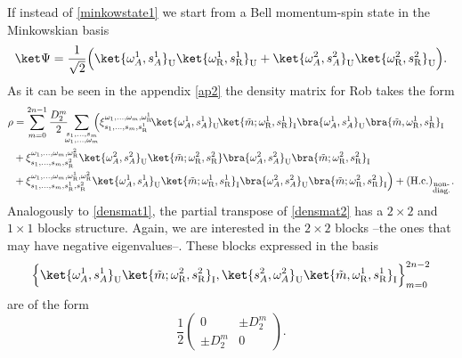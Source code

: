 If instead of \eqref{minkowstate1} we start from a Bell momentum-spin state in the Minkowskian basis
\begin{equation}\label{minkowstate2}\ket\Psi=\frac{1}{\sqrt2}\Big(\ket{\omega_A^1,s_A^1}_{\text{U}}\ket{\omega^1_\text{R},s^1_\text{R}}_\text{U}+\ket{\omega^2_A,s^2_A}_{\text{U}}\ket{\omega^2_\text{R},s^2_\text{R}}_\text{U}\Big).
\end{equation}
As it can be seen in the appendix \ref{ap2} the density matrix for Rob takes the form 
\begin{align}\label{densmat2}
\rho&=\nonumber\sum_{m=0}^{2n-1}\frac{D_{2}^m}{2}\!\!\!\sum_{\substack{s_1,\dots,s_m\\\omega_1,\dots,\omega_m}}\!\!\!\!
\Big(\xi_{s_1,\dots,s_m,s_\text{R}^1}^{\omega_1,\dots,\omega_m,\omega_\text{R}^1}\!\ket{\omega^1_A,s^1_A}_\text{U}\!\ket{\tilde m;\omega^1_\text{R},s^1_\text{R}}_\text{I}\bra{\omega^1_A,s^1_A}_{\text{U}}\bra{\tilde m,\omega^1_\text{R},s^1_\text{R}}_\text{I}\\*
&\nonumber+\xi_{s_1,\dots,s_m,s_\text{R}^2}^{\omega_1,\dots,\omega_m,\omega_\text{R}^2}\ket{\omega^2_A,s^2_A}_{\text{U}}\ket{\tilde m;\omega^2_\text{R},s^2_\text{R}}\bra{\omega_A^2,s_A^2}_{\text{U}}\bra{\tilde m;\omega^2_\text{R},s_\text{R}^2}_\text{I}\\*
&+\xi_{s_1,\dots,s_m,s_\text{R}^1,s_\text{R}^2}^{\omega_1,\dots,\omega_m,\omega_\text{R}^1,\omega_\text{R}^2}\ket{\omega^1_A,s^1_A}_{\text{U}}\ket{\tilde m;\omega_\text{R}^1,s_\text{R}^1}_\text{I}\bra{\omega^2_A,s^2_A}_{\text{U}}\bra{\tilde m;\omega^2_\text{R},s^2_\text{R}}_\text{I}\Big)+(\text{H.c.})_{_{\substack{\text{non-}\\\text{diag.}}}}.
\end{align}
Analogously to \eqref{densmat1}, the partial transpose of \eqref{densmat2} has a $2\times2$ and $1\times1$ blocks structure. Again, we are interested in the 
$2\times2$ blocks --the ones that may have negative eigenvalues--. These blocks expressed in the basis
\begin{equation}\label{blocksbasis2}
\Big\{\ket{\omega^1_A,s^1_A}_\text{U}\ket{\tilde m;\omega^2_\text{R},s^2_\text{R}}_\text{I},\ket{s^2_A,\omega^2_A}_\text{U}\ket{\tilde m,\omega^1_\text{R},s^1_\text{R}}_\text{I}\Big\}_{m=0}^{2n-2}
\end{equation}
are of the form
\begin{equation}\label{blocks2}
\frac12
\left(\begin{array}{cc}
0 & \pm D_2^m\\
\pm D_2^m & 0
\end{array}\right).
\end{equation}
